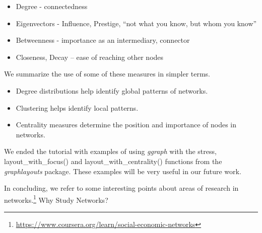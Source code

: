 \documentclass[
]{article}
\providecommand{\tightlist}{%
  \setlength{\itemsep}{0pt}\setlength{\parskip}{0pt}}
\begin{document}
\begin{itemize}
\tightlist
\item
  Degree - connectedness
\item
  Eigenvectors - Influence, Prestige, ``not what you know, but whom you know''
\item
  Betweenness - importance as an intermediary, connector
\item
  Closeness, Decay -- ease of reaching other nodes
\end{itemize}

We summarize the use of some of these measures in simpler terms.

\begin{itemize}
\tightlist
\item
  Degree distributions help identify global patterns of networks.
\item
  Clustering helps identify local patterns.
\item
  Centrality measures determine the position and importance of nodes in networks.
\end{itemize}

We ended the tutorial with examples of using \emph{ggraph} with the stress, layout\_with\_focus() and layout\_with\_centrality() functions from the \emph{graphlayouts} package. These examples will be very useful in our future work.

In concluding, we refer to some interesting points about areas of research in networks.\footnote{\url{https://www.coursera.org/learn/social-economic-networks}}
Why Study Networks?
\end{document}
